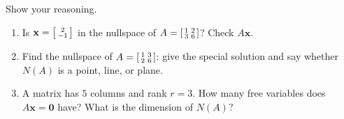 \documentclass[10pt]{article}
\newcommand{\xx}{\mathbf{x}}
\newcommand{\zero}{\mathbf{0}}
\begin{document}
\begin{practicebox}
Show your reasoning.
\begin{enumerate}[leftmargin=1.6em, itemsep=4pt]
  \item Is $\xx=\begin{bsmallmatrix} 2\\-1 \end{bsmallmatrix}$ in the nullspace of $A=\begin{bsmallmatrix} 1 & 2 \\ 3 & 6 \end{bsmallmatrix}$? Check $A\xx$. \writeline
  \item Find the nullspace of $A=\begin{bsmallmatrix} 1 & 3 \\ 2 & 6 \end{bsmallmatrix}$: give the special solution and say whether $N(A)$ is a point, line, or plane. \writeline
  \item A matrix has $5$ columns and rank $r=3$. How many free variables does $A\xx=\zero$ have? What is the dimension of $N(A)$? \writeline
\end{enumerate}
\end{practicebox}
\end{document}
